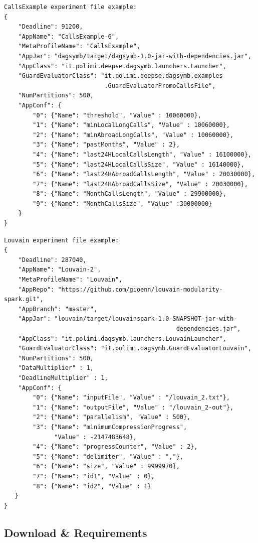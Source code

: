 \begin{verbatim}
CallsExample experiment file example:
{
    "Deadline": 91200,
    "AppName": "CallsExample-6",
    "MetaProfileName": "CallsExample",
    "AppJar": "dagsymb/target/dagsymb-1.0-jar-with-dependencies.jar",
    "AppClass": "it.polimi.deepse.dagsymb.launchers.Launcher",
    "GuardEvaluatorClass": "it.polimi.deepse.dagsymb.examples
                            .GuardEvaluatorPromoCallsFile",
    "NumPartitions": 500,
    "AppConf": {
        "0": {"Name": "threshold", "Value" : 10060000},
        "1": {"Name": "minLocalLongCalls", "Value" : 10060000},
        "2": {"Name": "minAbroadLongCalls", "Value" : 10060000},
        "3": {"Name": "pastMonths", "Value" : 2},
        "4": {"Name": "last24HLocalCallsLength", "Value" : 16100000},
        "5": {"Name": "last24HLocalCallsSize", "Value" : 16140000},
        "6": {"Name": "last24HAbroadCallsLength", "Value" : 20030000},
        "7": {"Name": "last24HAbroadCallsSize", "Value" : 20030000},
        "8": {"Name": "MonthCallsLength", "Value" : 29900000},
        "9": {"Name": "MonthCallsSize", "Value" :30000000}
    }
}
\end{verbatim}

\begin{verbatim}
Louvain experiment file example:
{
    "Deadline": 287040,
    "AppName": "Louvain-2",
    "MetaProfileName": "Louvain",
    "AppRepo": "https://github.com/gioenn/louvain-modularity-spark.git",
    "AppBranch": "master",
    "AppJar": "louvain/target/louvainspark-1.0-SNAPSHOT-jar-with-
                                                dependencies.jar",
    "AppClass": "it.polimi.dagsymb.launchers.LouvainLauncher",
    "GuardEvaluatorClass": "it.polimi.dagsymb.GuardEvaluatorLouvain",
    "NumPartitions": 500,
    "DataMultiplier" : 1,
    "DeadlineMultiplier" : 1,
    "AppConf": {
        "0": {"Name": "inputFile", "Value" : "/louvain_2.txt"},
        "1": {"Name": "outputFile", "Value" : "/louvain_2-out"},
        "2": {"Name": "parallelism", "Value" : 500},
        "3": {"Name": "minimumCompressionProgress", 
              "Value" : -2147483648},
        "4": {"Name": "progressCounter", "Value" : 2},
        "5": {"Name": "delimiter", "Value" : ","},
        "6": {"Name": "size", "Value" : 9999970},
        "7": {"Name": "id1", "Value" : 0},
        "8": {"Name": "id2", "Value" : 1}      		
   }
}
\end{verbatim}

\hypertarget{download-requirements}{%
\subsection{Download \& Requirements}\label{download-requirements}}

